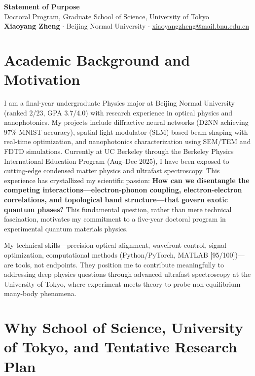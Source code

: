 \documentclass[11pt,a4paper]{article}
\begin{document}
\begin{center}
    {\large \textbf{Statement of Purpose}}\\[0.2em]
    {\normalsize Doctoral Program, Graduate School of Science, University of Tokyo}\\[0.5em]
    \textbf{Xiaoyang Zheng} $\cdot$ Beijing Normal University $\cdot$ \href{mailto:xiaoyangzheng@mail.bnu.edu.cn}{xiaoyangzheng@mail.bnu.edu.cn}
\end{center}

\vspace{-0.4em}

\section{Academic Background and Motivation}

I am a final-year undergraduate Physics major at Beijing Normal University (ranked 2/23, GPA 3.7/4.0) with research experience in optical physics and nanophotonics. My projects include diffractive neural networks (D2NN achieving 97\% MNIST accuracy), spatial light modulator (SLM)-based beam shaping with real-time optimization, and nanophotonics characterization using SEM/TEM and FDTD simulations. Currently at UC Berkeley through the Berkeley Physics International Education Program (Aug--Dec 2025), I have been exposed to cutting-edge condensed matter physics and ultrafast spectroscopy. This experience has crystallized my scientific passion: \textbf{How can we disentangle the competing interactions—electron-phonon coupling, electron-electron correlations, and topological band structure—that govern exotic quantum phases?} This fundamental question, rather than mere technical fascination, motivates my commitment to a five-year doctoral program in experimental quantum materials physics.

My technical skills—precision optical alignment, wavefront control, signal optimization, computational methods (Python/PyTorch, MATLAB [95/100])—are tools, not endpoints. They position me to contribute meaningfully to addressing deep physics questions through advanced ultrafast spectroscopy at the University of Tokyo, where experiment meets theory to probe non-equilibrium many-body phenomena.

\section{Why School of Science, University of Tokyo, and Tentative Research Plan}
\end{document}
